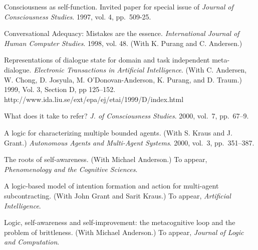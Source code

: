 \paper
Consciousness as self-function. Invited paper for special issue
of {\sl Journal of Consciousness Studies}. 1997, vol. 4, pp.~509-25.

\paper
Conversational Adequacy: Mistakes are the essence.
{\sl International Journal of Human Computer Studies}. 1998, vol. 48.
(With K. Purang and C. Andersen.)

\paper
Representations of dialogue state for domain and task independent
meta-dialogue. 
{\sl Electronic
Transactions in Artificial Intelligence}. (With C. Andersen, W. Chong,
D. Josyula, M. O'Donovan-Anderson, K. Purang, and D. Traum.)
1999, Vol. 3, Section D, pp 125--152.
http://www.ida.liu.se/ext/epa/ej/etai/1999/D/index.html

\paper
What does it take to refer?
{\sl J. of Consciousness Studies}. 2000, vol.~7, pp.~67--9.

\paper
A logic for characterizing multiple bounded agents.
(With S. Kraus and J. Grant.) {\sl Autonomous Agents and
Multi-Agent Systems}. 2000, vol.~3, pp.~351--387.

\paper
The roots of self-awareness.
(With Michael Anderson.)  To appear, {\sl Phenomenology and the Cognitive
Sciences}.

\paper
A logic-based model of intention formation and action for multi-agent
subcontracting.
(With John Grant and Sarit Kraus.) To appear, {\sl Artificial Intelligence}.

\paper
Logic, self-awareness and self-improvement: the metacognitive loop and
the problem of brittleness.
(With Michael Anderson.) To appear, {\sl Journal of Logic and Computation}.





%





